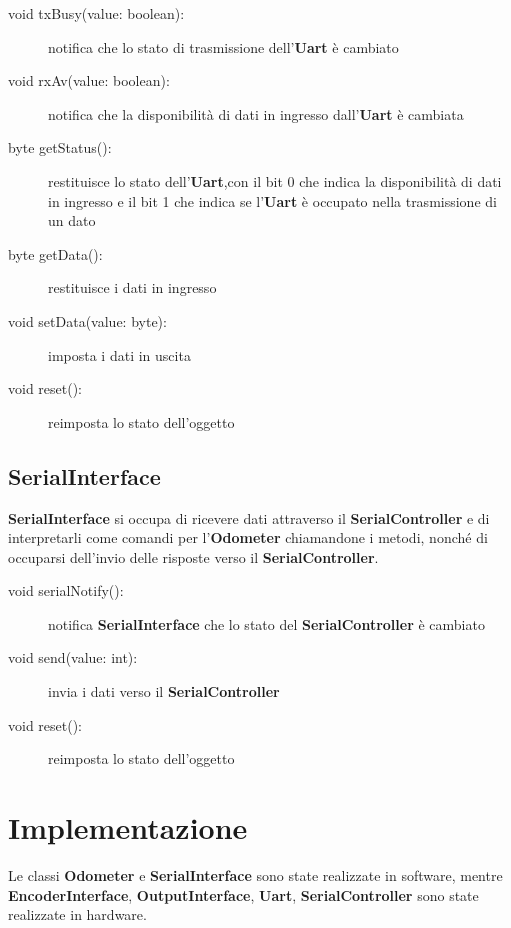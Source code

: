 \documentclass [11pt,a4paper,oneside]{article}
\newcommand{\component}[1]{\textbf{#1}}
\begin{document}
\begin{description}
\item[void txBusy(value: boolean):] notifica che lo stato di trasmissione
    dell'\component{Uart} è cambiato
\item[void rxAv(value: boolean):] notifica che la disponibilità di dati
    in ingresso dall'\component{Uart} è cambiata
\item[byte getStatus():] restituisce lo stato dell'\component{Uart},con il
    bit 0 che indica la disponibilità di dati in ingresso e il bit 1 che
    indica se l'\component{Uart} è occupato nella trasmissione di un dato
\item[byte getData():] restituisce i dati in ingresso
\item[void setData(value: byte):] imposta i dati in uscita
\item[void reset():] reimposta lo stato dell'oggetto
\end{description}

\subsection{SerialInterface}
\component{SerialInterface} si occupa di ricevere dati attraverso il
\component{SerialController} e di interpretarli come comandi per
l'\component{Odometer} chiamandone i metodi, nonché di occuparsi
dell'invio delle risposte verso il \component{SerialController}.

\begin{description}
\item[void serialNotify():] notifica \component{SerialInterface} che
    lo stato del \component{SerialController} è cambiato
\item[void send(value: int):] invia i dati verso il
    \component{SerialController}
\item[void reset():] reimposta lo stato dell'oggetto
\end{description}

\section{Implementazione}

Le classi \component{Odometer} e \component{SerialInterface} sono state
realizzate in software, mentre \component{EncoderInterface}, 
\component{OutputInterface}, \component{Uart}, \component{SerialController}
sono state realizzate in hardware.
\end{document}
